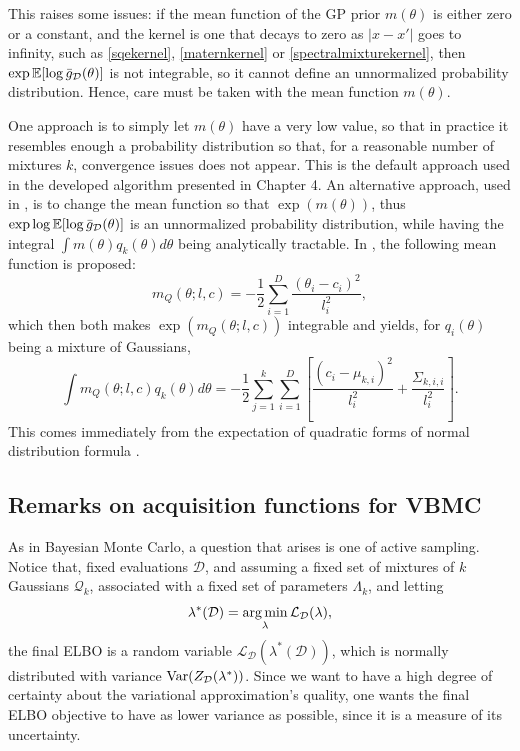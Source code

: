This raises some issues: if the mean function of the GP prior $m(\theta)$ is either zero or a constant, and the kernel is one that decays to zero as $|x - x'|$ goes to infinity, such as \eqref{sqekernel}, \eqref{maternkernel} or \eqref{spectralmixturekernel}, then $\exp {\mathbb E}[\log {\bar{g}}_\mathcal{D}(\theta)]$ is not integrable, so it cannot define an unnormalized probability distribution. Hence, care must be taken with the mean function $m(\theta)$.

One approach is to simply let $m(\theta)$ have a very low value, so that in practice it resembles enough a probability distribution so that, for a reasonable number of mixtures $k$, convergence issues does not appear. This is the default approach used in the developed algorithm presented in Chapter 4. An alternative approach, used in \cite{Acerbi_2018}, is to change the mean function so that $\exp(m(\theta))$, thus $\exp \log {\mathbb E}[\log {\bar{g}}_\mathcal{D}(\theta)]$ is an unnormalized probability distribution, while having the integral $\int m(\theta) q_k(\theta) d \theta$ being analytically tractable. In \cite{Acerbi_2018}, the following mean function is proposed:
\begin{equation}\label{vbmc_quadratic_mean}
 m_{Q}(\theta;l,c) = - \frac{1}{2} \sum_{i=1}^D \frac{(\theta_i - c_i)^2}{l_i^2},
\end{equation}
which then both makes $\exp(m_Q(\theta;l,c))$ integrable and yields, for $q_i(\theta)$ being a mixture of Gaussians, 
\begin{equation}
 \int m_{Q}(\theta;l,c) q_k(\theta) d\theta = 
 	-\frac{1}{2} \sum_{j=1}^k \sum_{i=1}^D \left[\frac{(c_i - \mu_{k,i})^2}{l_i^2} + \frac{\Sigma_{k,i,i}}{l_i^2} \right].
\end{equation}
This comes immediately from the expectation of quadratic forms of normal distribution formula \cite{Petersen_2012}. 

\subsection{Remarks on acquisition functions for VBMC}
As in Bayesian Monte Carlo, a question that arises is one of active sampling. Notice that, fixed evaluations $\mathcal{D}$, and assuming a fixed set of mixtures of $k$ Gaussians $\mathcal{Q}_k$, associated with a fixed set of parameters $\Lambda_k$, and letting
\begin{equation}
\lambda^*(\mathcal{D}) = \operatorname*{arg\,min}_{\lambda} \mathcal{L}_\mathcal{D}(\lambda),
\end{equation}
the final ELBO is a random variable $\mathcal{L}_{\mathcal{D}}(\lambda^*(\mathcal{D}))$, which is normally distributed with variance $\mathrm{Var}(Z_\mathcal{D}(\lambda^*))$. Since we want to have a high degree of certainty about the variational approximation's quality, one wants the final ELBO objective to have as lower variance as possible, since it is a measure of its uncertainty.

